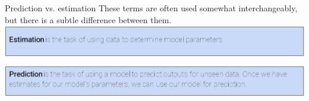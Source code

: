 \documentclass[aspectratio=169]{../latex_main/tntbeamer}  %
\begin{document}
	
	\begin{frame}{Prediction vs. estimation}
	    These terms are often used somewhat interchangeably, but there is a subtle difference between them.\\
	    \bigskip
	    \includegraphics[scale=.4]{Bild20}
	\end{frame}
\end{document}
